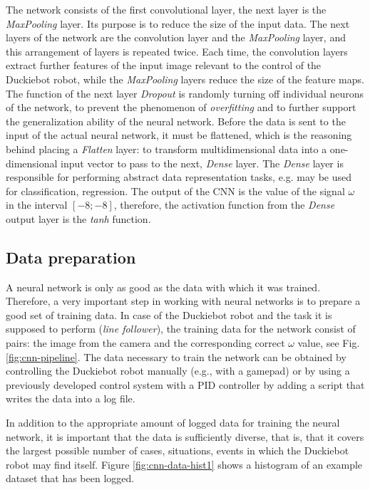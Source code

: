 \documentclass[conference]{IEEEtran}
\begin{document}
The network consists of the first convolutional layer, the next layer is the \emph{MaxPooling} layer. Its purpose is to reduce the size of the input data. The next layers of the network are the convolution layer and the \emph{MaxPooling} layer, and this arrangement of layers is repeated twice. Each time, the convolution layers extract further features of the input image relevant to the control of the Duckiebot robot, while the \emph{MaxPooling} layers reduce the size of the feature maps. The function of the next layer \emph{Dropout} is randomly turning off individual neurons of the network, to prevent the phenomenon of \emph{overfitting} and to further support the generalization ability of the neural network. Before the data is sent to the input of the actual neural network, it must be flattened, which is the reasoning behind placing a \emph{Flatten} layer: to transform multidimensional data into a one-dimensional input vector to pass to the next, \emph{Dense} layer. The \emph{Dense} layer is responsible for performing abstract data representation tasks, e.g. may be used for classification, regression. The output of the CNN is the value of the signal $\omega$ in the interval $[-8 ; -8]$, therefore, the activation function from the \emph{Dense} output layer is the \emph{tanh} function.

\subsection{Data preparation}
A neural network is only as good as the data with which it was trained. Therefore, a very important step in working with neural networks is to prepare a good set of training data. In case of the Duckiebot robot and the task it is supposed to perform (\emph{line follower}), the training data for the network consist of pairs: the image from the camera and the corresponding correct $\omega$ value, see Fig. \ref{fig:cnn-pipeline}. The data necessary to train the network can be obtained by controlling the Duckiebot robot manually (e.g., with a gamepad) or by using a previously developed control system with a PID controller by adding a script that writes the data into a log file. 

In addition to the appropriate amount of logged data for training the neural network, it is important that the data is sufficiently diverse, that is, that it covers the largest possible number of cases, situations, events in which the Duckiebot robot may find itself. Figure \ref{fig:cnn-data-hist1} shows a histogram of an example dataset that has been logged. 
\end{document}
